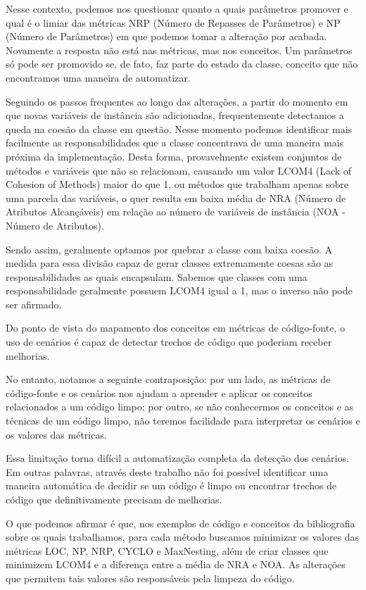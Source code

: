 Nesse contexto, podemos nos questionar quanto a quais parâmetros promover e qual é o limiar das métricas
NRP (Número de Repasses de Parâmetros) e NP (Número de Parâmetros)
em que podemos tomar a alteração por acabada. Novamente a resposta não está nas métricas, mas nos conceitos.
Um parâmetros só pode ser promovido se, de fato, faz parte do estado da classe, conceito que não encontramos
uma maneira de automatizar.

Seguindo os passos frequentes ao longo das alterações, a partir do momento em que novas variáveis de instância
são adicionadas, frequentemente detectamos a queda na coesão da classe em questão. Nesse momento podemos identificar
mais facilmente as responsabilidades que a classe concentrava de uma maneira mais próxima da implementação.
Desta forma, provavelmente existem conjuntos de métodos e variáveis que não se relacionam, causando um valor
LCOM4 (Lack of Cohesion of Methods) maior do que 1, ou métodos que trabalham apenas sobre uma parcela das
variáveis, o quer resulta em baixa média de NRA (Número de Atributos Alcançáveis) em relação ao
número de variáveis de instância (NOA - Número de Atributos).

Sendo assim, geralmente optamos por quebrar a classe com baixa coesão. A medida para essa divisão capaz de
gerar classes extremamente coesas são as responsabilidades as quais encapsulam. Sabemos que classes com uma
responsabilidade geralmente possuem LCOM4 igual a 1, mas o inverso não pode ser afirmado.

\vskip 1.0cm
Do ponto de vista do mapamento dos conceitos em métricas de código-fonte, o uso
de cenários é capaz de detectar trechos de código que poderiam receber melhorias.

No entanto, notamos a seguinte contraposição: por um lado, as métricas de código-fonte e os cenários nos
ajudam a aprender e aplicar os conceitos relacionados a um código limpo; por outro, se não conhecermos os
conceitos e as técnicas de um código limpo, não teremos facilidade para interpretar os cenários e os valores
das métricas.

Essa limitação torna difícil a automatização completa da detecção dos cenários. Em outras palavras,
através deste trabalho não foi possível identificar uma maneira automática de decidir se um código é limpo ou
encontrar trechos de código que definitivamente precisam de melhorias.

O que podemos afirmar é que, nos exemplos de código e conceitos da bibliografia sobre os quais trabalhamos,
para cada método buscamos minimizar os valores das métricas LOC, NP, NRP, CYCLO e MaxNesting, além de criar
classes que minimizem LCOM4 e a diferença entre a média de NRA e NOA. As alterações que permitem tais valores
são responsáveis pela limpeza do código.


